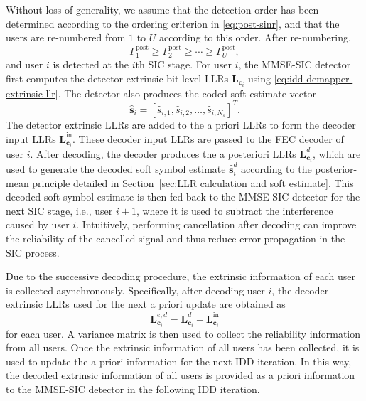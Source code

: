 Without loss of generality, we assume that the detection order has been determined according to the ordering criterion in \eqref{eq:post-sinr}, and that the users are re-numbered from $1$ to $U$ according to this order. After re-numbering,
\begin{equation}
    \Gamma^{\mathrm{post}}_1
    \geq
    \Gamma^{\mathrm{post}}_2
    \geq
    \cdots
    \geq
    \Gamma^{\mathrm{post}}_U ,
\end{equation}
and user $i$ is detected at the $i$th SIC stage. For user $i$, the MMSE-SIC detector first computes the detector extrinsic bit-level LLRs $\bm{L}_{\bm{c}_i}$ using \eqref{eq:idd-demapper-extrinsic-llr}. The detector also produces the coded soft-estimate vector
\begin{equation}
    \hat{\bm{s}}_i
    =
    [\hat{s}_{i,1},\hat{s}_{i,2},\ldots,\hat{s}_{i,N_s}]^T .
\end{equation}
The detector extrinsic LLRs are added to the a priori LLRs to form the decoder input LLRs $\bm{L}^{\mathrm{in}}_{\bm{c}_i}$. These decoder input LLRs are passed to the FEC decoder of user $i$. After decoding, the decoder produces the a posteriori LLRs $\bm{L}^{d}_{\bm{c}_i}$, which are used to generate the decoded soft symbol estimate $\hat{\bm{s}}^d_i$ according to the posterior-mean principle detailed in Section~\ref{sec:LLR calculation and soft estimate}. This decoded soft symbol estimate is then fed back to the MMSE-SIC detector for the next SIC stage, i.e., user $i+1$, where it is used to subtract the interference caused by user $i$. Intuitively, performing cancellation after decoding can improve the reliability of the cancelled signal and thus reduce error propagation in the SIC process.

Due to the successive decoding procedure, the extrinsic information of each user is collected asynchronously. Specifically, after decoding user $i$, the decoder extrinsic LLRs used for the next a priori update are obtained as
\begin{equation}
    \bm{L}^{e,d}_{\bm{c}_i}
    =
    \bm{L}^{d}_{\bm{c}_i}
    -
    \bm{L}^{\mathrm{in}}_{\bm{c}_i}
\end{equation}
for each user. A variance matrix is then used to collect the reliability information from all users. Once the extrinsic information of all users has been collected, it is used to update the a priori information for the next IDD iteration. In this way, the decoded extrinsic information of all users is provided as a priori information to the MMSE-SIC detector in the following IDD iteration.

